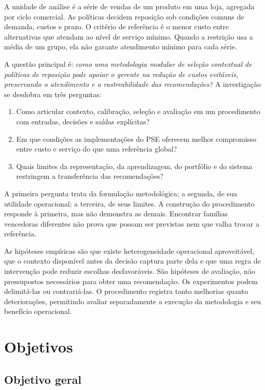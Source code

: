 A unidade de análise é a série de vendas de um produto em uma loja, agregada por ciclo comercial. As políticas decidem reposição sob condições comuns de demanda, custos e prazo. O critério de referência é o menor custo entre alternativas que atendam ao nível de serviço mínimo. Quando a restrição usa a média de um grupo, ela não garante atendimento mínimo para cada série.

A questão principal é: \emph{como uma metodologia modular de seleção contextual de políticas de reposição pode apoiar o gerente na redução de custos evitáveis, preservando o atendimento e a rastreabilidade das recomendações?} A investigação se desdobra em três perguntas:

\begin{enumerate}
  \item Como articular contexto, calibração, seleção e avaliação em um procedimento com entradas, decisões e saídas explícitas?
  \item Em que condições as implementações do PSE oferecem melhor compromisso entre custo e serviço do que uma referência global?
  \item Quais limites da representação, da aprendizagem, do portfólio e do sistema restringem a transferência das recomendações?
\end{enumerate}

A primeira pergunta trata da formulação metodológica; a segunda, de sua utilidade operacional; a terceira, de seus limites. A construção do procedimento responde à primeira, mas não demonstra as demais. Encontrar famílias vencedoras diferentes não prova que possam ser previstas nem que valha trocar a referência.

As hipóteses empíricas são que existe heterogeneidade operacional aproveitável, que o contexto disponível antes da decisão captura parte dela e que uma regra de intervenção pode reduzir escolhas desfavoráveis. São hipóteses de avaliação, não pressupostos necessários para obter uma recomendação. Os experimentos podem delimitá-las ou contrariá-las. O procedimento registra tanto melhorias quanto deteriorações, permitindo avaliar separadamente a execução da metodologia e seu benefício operacional.

\section{Objetivos}

\subsection*{Objetivo geral}

